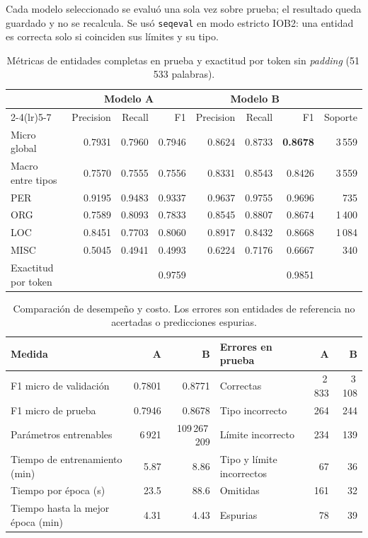 \documentclass[10pt,a4paper]{article}
\begin{document}
Cada modelo seleccionado se evaluó una sola vez sobre prueba; el resultado queda guardado y no se recalcula. Se usó \texttt{seqeval} en modo estricto IOB2: una entidad es correcta solo si coinciden sus límites y su tipo.

\begin{table}[H]
\centering\small
\caption{Métricas de entidades completas en prueba y exactitud por token sin \textit{padding} (51\,533 palabras).}
\begin{tabular}{lrrrrrrr}
\toprule
& \multicolumn{3}{c}{Modelo A} & \multicolumn{3}{c}{Modelo B} & \\
\cmidrule(lr){2-4}\cmidrule(lr){5-7}
& Precision & Recall & F1 & Precision & Recall & F1 & Soporte \\
\midrule
Micro global & 0.7931 & 0.7960 & 0.7946 & 0.8624 & 0.8733 & \textbf{0.8678} & 3\,559 \\
Macro entre tipos & 0.7570 & 0.7555 & 0.7556 & 0.8331 & 0.8543 & 0.8426 & 3\,559 \\
PER & 0.9195 & 0.9483 & 0.9337 & 0.9637 & 0.9755 & 0.9696 & 735 \\
ORG & 0.7589 & 0.8093 & 0.7833 & 0.8545 & 0.8807 & 0.8674 & 1\,400 \\
LOC & 0.8451 & 0.7703 & 0.8060 & 0.8917 & 0.8432 & 0.8668 & 1\,084 \\
MISC & 0.5045 & 0.4941 & 0.4993 & 0.6224 & 0.7176 & 0.6667 & 340 \\
\midrule
Exactitud por token & \multicolumn{3}{r}{0.9759} & \multicolumn{3}{r}{0.9851} & \\
\bottomrule
\end{tabular}
\end{table}

\begin{table}[H]
\centering\small
\caption{Comparación de desempeño y costo. Los errores son entidades de referencia no acertadas o predicciones espurias.}
\begin{tabular}{lrr@{\hspace{2.2em}}lrr}
\toprule
Medida & A & B & Errores en prueba & A & B \\
\midrule
F1 micro de validación & 0.7801 & 0.8771 & Correctas & 2\,833 & 3\,108 \\
F1 micro de prueba & 0.7946 & 0.8678 & Tipo incorrecto & 264 & 244 \\
Parámetros entrenables & 6\,921 & 109\,267\,209 & Límite incorrecto & 234 & 139 \\
Tiempo de entrenamiento (min) & 5.87 & 8.86 & Tipo y límite incorrectos & 67 & 36 \\
Tiempo por época (s) & 23.5 & 88.6 & Omitidas & 161 & 32 \\
Tiempo hasta la mejor época (min) & 4.31 & 4.43 & Espurias & 78 & 39 \\
\bottomrule
\end{tabular}
\end{table}
\end{document}
